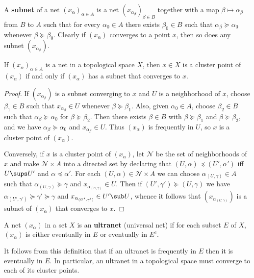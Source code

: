 A \textbf{subnet} of a net $(x_\alpha)_{\alpha\in A}$ is a net $(x_{\alpha_\beta})_{\beta\in B}$ together with a map $\beta\mapsto\alpha_\beta$ from $B$ to $A$ such that for every $\alpha_0\in A$ there exists $\beta_0\in B$ such that $\alpha_\beta\succeq\alpha_0$ whenever $\beta\succeq\beta_0$. Clearly if $(x_\alpha)$ converges to a point $x$, then so does any subnet $(x_{\alpha_\beta})$.
\begin{proposition}\label{net cluster point iff subnet}
If $(x_\alpha)_{\alpha\in A}$ is a net in a topological space $X$, then $x\in X$ is a cluster point  of $(x_\alpha)$ if and only if $(x_\alpha)$ has a subnet that converges to $x$.
\end{proposition}
\begin{proof}
If $(x_{\alpha_\beta})$ is a subnet converging to $x$ and $U$ is a neighborhood of $x$, choose $\beta_1\in B$ such that $x_{\alpha_\beta}\in U$ whenever $\beta\succeq\beta_1$. Also, given $\alpha_0\in A$, choose $\beta_2\in B$ such that $\alpha_\beta\succeq\alpha_0$ for $\beta\succeq\beta_2$. Then there exists $\beta\in B$ with $\beta\succeq\beta_1$ and $\beta\succeq\beta_2$, and we have $\alpha_\beta\succeq\alpha_0$ and $x_{\alpha_\beta}\in U$. Thus $(x_\alpha)$ is frequently in $U$, so $x$ is a cluster point of $(x_\alpha)$.\par
Conversely, if $x$ is a cluster point  of $(x_\alpha)$, let $\mathcal{N}$ be the set of neighborhoods of $x$ and make $\mathcal{N}\times A$ into a directed set by declaring that $(U,\alpha)\preceq(U',\alpha')$ iff $U\sups U'$ and $\alpha\preceq\alpha'$. For each $(U,\alpha)\in\mathcal{N}\times A$ we can choose $\alpha_{(U,\gamma)}\in A$ such that $\alpha_{(U,\gamma)}\succeq\gamma$ and $x_{\alpha_{(U,\gamma)}}\in U$. Then if $(U',\gamma')\succeq(U,\gamma)$ we have $\alpha_{(U',\gamma')}\succeq\gamma'\succeq\gamma$ and $x_{\alpha_{(U',\gamma')}}\in U'\sub U$, whence it follows that $(x_{\alpha_{(U,\gamma)}})$ is a subnet of $(x_\alpha)$ that converges to $x$.
\end{proof}
\begin{definition}
A net $(x_\alpha)$ in a set $X$ is an \textbf{ultranet} (universal net) if for each subset $E$ of $X$, $(x_\alpha)$ is either eventually in $E$ or eventually in $E^c$.
\end{definition}
It follows from this definition that if an ultranet is frequently in $E$ then it is eventually in $E$. In particular, an ultranet in a topological space must converge to each of its cluster points.\par
